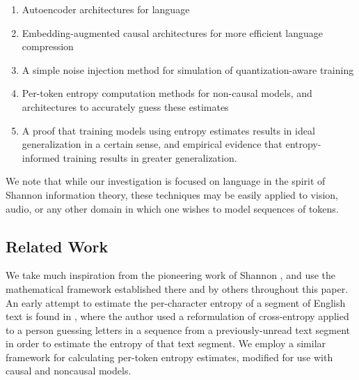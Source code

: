 \documentclass{article}
\begin{document}
    
    \vspace{0.15cm}
    \vspace{0.15cm}
    
    \vspace{0.15cm}

    \begin{enumerate}[nosep]
    \item Autoencoder architectures for language
    \item Embedding-augmented causal architectures for more efficient language compression
    \item A simple noise injection method for simulation of quantization-aware training
    \item Per-token entropy computation methods for non-causal models, and architectures to accurately guess these estimates
    \item A proof that training models using entropy estimates results in ideal generalization in a certain sense, and empirical evidence that entropy-informed training results in greater generalization.
    \end{enumerate}
    \vspace{0.15cm}
    We note that while our investigation is focused on language in the spirit of Shannon information theory, these techniques may be easily applied to vision, audio, or any other domain in which one wishes to model sequences of tokens.

\subsection{Related Work}
    
    We take much inspiration from the pioneering work of Shannon \citep{shannon1948mathematical}, and use the mathematical framework established there and by others \citep{wiener2019cybernetics} throughout this paper. An early attempt to estimate the per-character entropy of a segment of English text is found in \citep{shannon1951prediction}, where the author used a reformulation of cross-entropy applied to a person guessing letters in a sequence from a previously-unread text segment in order to estimate the entropy of that text segment. We employ a similar framework for calculating per-token entropy estimates, modified for use with causal and noncausal models.
\end{document}
